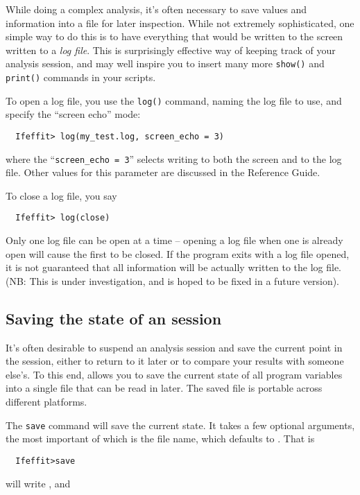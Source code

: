 \documentclass[11pt]{article}
\begin{document}
While doing a complex analysis, it's often necessary to save values and
information into a file for later inspection.  While not extremely
sophisticated, one simple way to do this is to have everything that would be
written to the screen written to a {\emph{log file}}.  This is surprisingly
effective way of keeping track of your analysis session, and may well
inspire you to insert many more {\tt{show()}} and {\tt{print()}} commands
in your scripts.

To open a log file, you use the {\tt{log()}} command, naming the log file
to use, and specify the ``screen echo'' mode:
{\small\begin{verbatim}
  Ifeffit> log(my_test.log, screen_echo = 3)
\end{verbatim}
}\noindent
where the ``{\tt{screen\_echo = 3}}'' selects writing to both the screen
and to the log file.  Other values for this parameter are discussed in the
Reference Guide.   

To close a log file, you say
{\small\begin{verbatim}
  Ifeffit> log(close)
\end{verbatim}
}\noindent
Only one log file can be open at a time -- opening a log file when one is
already open will cause the first to be closed.  If the program exits with
a log file opened, it is not guaranteed that all information will be
actually written to the log file.  (NB: This is under investigation, and is
hoped to be fixed in a future version).


\subsection{Saving the state of an {\ifeffit} session}
\label{s:log-save:save-restore}

It's often desirable to suspend an analysis session and save the current
point in the session, either to return to it later or to compare your
results with someone else's.  To this end, {\ifeffit} allows you to save
the current state of all program variables into a single file that can be
read in later.  The saved file is portable across different platforms.

The {\tt{save}} command will save the current state.  It takes a few
optional arguments, the most important of which is the file name, which
defaults to {}.  That is
{\small\begin{verbatim}
  Ifeffit>save
\end{verbatim}}\noindent
will write {}, and
\end{document}
